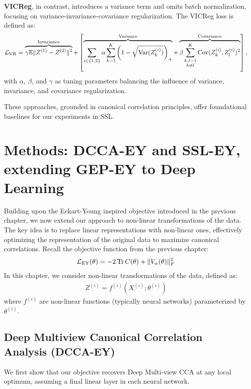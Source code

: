\textbf{VICReg}, in contrast, introduces a variance term and omits batch normalization, focusing on variance-invariance-covariance regularization.
The VICReg loss is defined as:
\begin{align}
    \mathcal{L}_\text{VR} = \overbrace{\gamma \mathbb{E} \lVert Z^{(1)} - Z^{(2)}\rVert^2}^{\text{Invariance}} + \left[\overbrace{\sum_{i \in \{1,2\}} \alpha \sum_{k=1}^K \left(1 - \sqrt{\mathrm{Var}(Z^{(i)}_k)}\right)_+}^{\text{Variance}} + \overbrace{\beta \sum_{\substack{k,l=1 \\ k \neq l}}^K \mathrm{Cov}(Z^{(i)}_k, Z^{(i)}_l)^2 }^{\text{Covariance}}\right],
\end{align}
with \( \alpha \), \( \beta \), and \( \gamma \) as tuning parameters balancing the influence of variance, invariance, and covariance regularization.

These approaches, grounded in canonical correlation principles, offer foundational baselines for our experiments in SSL.

\section{Methods: DCCA-EY and SSL-EY, extending GEP-EY to Deep Learning}

Building upon the Eckart-Young inspired objective introduced in the previous chapter, we now extend our approach to non-linear transformations of the data. The key idea is to replace linear representations with non-linear ones, effectively optimizing the representation of the original data to maximize canonical correlations.
Recall the objective function from the previous chapter:
\begin{align}
\mathcal{L}_\text{EY}(\theta) = -2 \operatorname{Tr} C(\theta) + \lVert V_\alpha(\theta)\rVert_F^2
\end{align}
In this chapter, we consider non-linear transformations of the data, defined as:
\begin{align}
Z^{(i)} = f^{(i)}(X^{(i)}; \theta^{(i)})
\end{align}
where $f^{(i)}$ are non-linear functions (typically neural networks) parameterized by $\theta^{(i)}$.

\subsection{Deep Multiview Canonical Correlation Analysis (DCCA-EY)}

We first show that our objective recovers Deep Multi-view CCA at any local optimum, assuming a final linear layer in each neural network.

